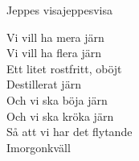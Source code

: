 \begin{song}{Jeppes visa}{jeppesvisa}
\begin{vers}
\repopen Vi vill ha mera järn\\
Vi vill ha flera järn\\
Ett litet rostfritt, oböjt\\
Destillerat järn\\
Och vi ska böja järn\\
Och vi ska kröka järn\\
Så att vi har det flytande\\
Imorgonkväll \repclose\\
\end{vers}
\end{song}

